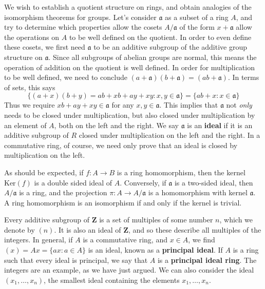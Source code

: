 We wish to establish a quotient structure on rings, and obtain analogies of the isomorphism theorems for groups. Let's consider $\mathfrak{a}$ as a subset of a ring $A$, and try to determine which properties allow the cosets $A/\mathfrak{a}$ of the form $x + \mathfrak{a}$ allow the operations on $A$ to be well defined on the quotient. In order to even define these cosets, we first need $\mathfrak{a}$ to be an additive subgroup of the additive group structure on $\mathfrak{a}$. Since all subgroups of abelian groups are normal, this means the operation of addition on the quotient is well defined. In order for multiplication to be well defined, we need to conclude $(a + \mathfrak{a})(b + \mathfrak{a}) = (ab + \mathfrak{a})$. In terms of sets, this says
%
\[ \{ (a + x)(b + y) = ab + xb + ay + xy : x,y \in \mathfrak{a} \} = \{ ab + x : x \in \mathfrak{a} \} \]
%
Thus we require $xb + ay + xy \in \mathfrak{a}$ for any $x,y \in \mathfrak{a}$. This implies that $\mathfrak{a}$ not {\it only} needs to be closed under multiplication, but also closed under multiplication by an element of $A$, both on the left and the right. We say $\mathfrak{a}$ is an {\bf ideal} if it is an additive subgroup of $R$ closed under multiplication on the left and the right. In a commutative ring, of course, we need only prove that an ideal is closed by multiplication on the left.

\begin{example}
    As should be expected, if $f: A \to B$ is a ring homomorphism, then the kernel $\text{Ker}(f)$ is a double sided ideal of $A$. Conversely, if $\mathfrak{a}$ is a two-sided ideal, then $A/\mathfrak{a}$ is a ring, and the projection $\pi: A \to A/\mathfrak{a}$ is a homomorphism with kernel $\mathfrak{a}$.  A ring homomorphism is an isomorphism if and only if the kernel is trivial.
\end{example}

\begin{example}
    Every additive subgroup of $\mathbf{Z}$ is a set of multiples of some number $n$, which we denote by $(n)$. It is also an ideal of $\mathbf{Z}$, and so these describe all multiples of the integers. In general, if $A$ is a commutative ring, and $x \in A$, we find $(x) = Ax = \{ ax: a \in A \}$ is an ideal, known as a {\bf principal ideal}. If $A$ is a ring such that every ideal is principal, we say that $A$ is a {\bf principal ideal ring}. The integers are an example, as we have just argued. We can also consider the ideal $(x_1, \dots, x_n)$, the smallest ideal containing the elements $x_1, \dots, x_n$.
\end{example}


